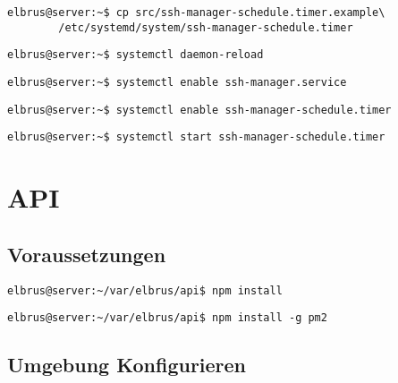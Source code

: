 \documentclass{article}
\begin{document}
	\begin{lstlisting}[caption={Kopieren des Zeitplanungsprogrammes.}]
		elbrus@server:~$ cp src/ssh-manager-schedule.timer.example\
		/etc/systemd/system/ssh-manager-schedule.timer
	\end{lstlisting}

	\begin{lstlisting}[caption={Neuladen des 'systemctl' Deamons.}]
		elbrus@server:~$ systemctl daemon-reload
	\end{lstlisting}

	\begin{lstlisting}[caption={Aktivieren des Serviceprogrammes.}]
		elbrus@server:~$ systemctl enable ssh-manager.service
	\end{lstlisting}

	\begin{lstlisting}[caption={Aktivieren des Zeitplanungsprogrammes.}]
		elbrus@server:~$ systemctl enable ssh-manager-schedule.timer
	\end{lstlisting}

	\begin{lstlisting}[caption={Starten des Zeitplanungsprogrammes.}]
		elbrus@server:~$ systemctl start ssh-manager-schedule.timer
	\end{lstlisting}
	\newpage
	
	\section{API}
	\lstset{style=commands}

	\subsection{Voraussetzungen}
	\begin{lstlisting}[caption={Nachinstallieren der Abhängigkeiten.}]
		elbrus@server:~/var/elbrus/api$ npm install
	\end{lstlisting}

	\begin{lstlisting}[caption={Installieren von 'pm2'.}]
		elbrus@server:~/var/elbrus/api$ npm install -g pm2
	\end{lstlisting}

	\newpage
	\subsection[file config]{Umgebung Konfigurieren}
	
\end{document}
